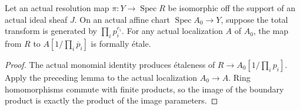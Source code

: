 \begin{lemma}\label{lem:sc0-monomial-transform-localized-stalk}
\leanok
{}
Let an actual resolution map $\pi:Y\to\operatorname{Spec}R$ be isomorphic off
the support of an actual ideal sheaf $J$. On an actual affine chart
$\operatorname{Spec}A_0\to Y$, suppose the total transform is generated by
$\prod_i p_i^{e_i}$. For any actual localization $A$ of $A_0$, the map from $R$
to $A[1/\prod_i \overline p_i]$ is formally \'etale.
\end{lemma}
\begin{proof}
The actual monomial identity produces \'etaleness of
$R\to A_0[1/\prod_i p_i]$. Apply the preceding lemma to the actual localization
$A_0\to A$. Ring homomorphisms commute with finite products, so the image of the
boundary product is exactly the product of the image parameters.
\end{proof}
